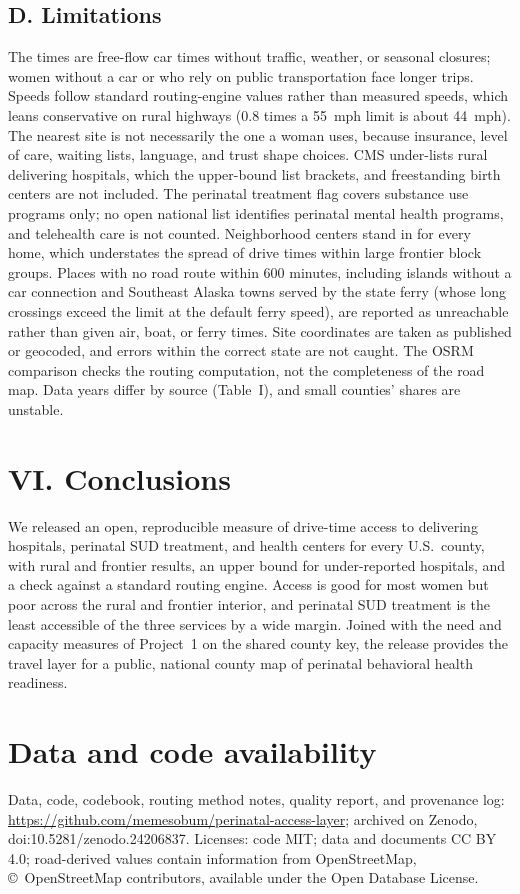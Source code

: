 \documentclass{article}
\begin{document}
\subsection*{D. Limitations}
The times are free-flow car times without traffic, weather, or seasonal closures; women without a car or who rely on public transportation face longer trips. Speeds follow standard routing-engine values rather than measured speeds, which leans conservative on rural highways (0.8 times a 55~mph limit is about 44~mph). The nearest site is not necessarily the one a woman uses, because insurance, level of care, waiting lists, language, and trust shape choices. CMS under-lists rural delivering hospitals, which the upper-bound list brackets, and freestanding birth centers are not included. The perinatal treatment flag covers substance use programs only; no open national list identifies perinatal mental health programs, and telehealth care is not counted. Neighborhood centers stand in for every home, which understates the spread of drive times within large frontier block groups. Places with no road route within 600 minutes, including islands without a car connection and Southeast Alaska towns served by the state ferry (whose long crossings exceed the limit at the default ferry speed), are reported as unreachable rather than given air, boat, or ferry times. Site coordinates are taken as published or geocoded, and errors within the correct state are not caught. The OSRM comparison checks the routing computation, not the completeness of the road map. Data years differ by source (Table~I), and small counties' shares are unstable.

\section*{VI. Conclusions}
We released an open, reproducible measure of drive-time access to delivering hospitals, perinatal SUD treatment, and health centers for every U.S.\ county, with rural and frontier results, an upper bound for under-reported hospitals, and a check against a standard routing engine. Access is good for most women but poor across the rural and frontier interior, and perinatal SUD treatment is the least accessible of the three services by a wide margin. Joined with the need and capacity measures of Project~1 on the shared county key, the release provides the travel layer for a public, national county map of perinatal behavioral health readiness.

\section*{Data and code availability}
Data, code, codebook, routing method notes, quality report, and provenance log: \url{https://github.com/memesobum/perinatal-access-layer}; archived on Zenodo, doi:10.5281/zenodo.24206837. Licenses: code MIT; data and documents CC BY 4.0; road-derived values contain information from OpenStreetMap, \copyright\ OpenStreetMap contributors, available under the Open Database License.
\end{document}
